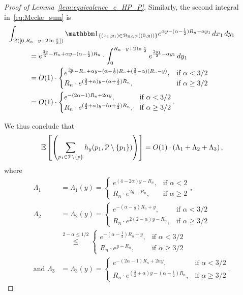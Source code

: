 \begin{proof}[Proof of Lemma~\ref{lem:equivalence_c_HP_P}]
Similarly, the second integral in~\eqref{eq:Mecke_sum} is
\begin{align*}
	&\hspace{-30pt}\int_{\Rcal ([0, R_n - y + 2 \ln \frac{\pi}{2}])} \ind{(x_1,y_1) \in \BallSym{(0,y)}} e^{\alpha y - (\alpha - \frac{1}{2})R_n - \alpha y_1} \, dx_1 \, dy_1\\
	&= e^{\frac{3y}{2} - R_n + \alpha y - (\alpha - \frac{1}{2})R_n} 
    	\cdot \int_{0}^{R_n - y + 2 \ln \frac{\pi}{2}} e^{\frac{3y_1}{2}-\alpha y_1} \, dy_1\\
	&= O(1)\cdot 
	\begin{cases} 
	e^{\frac{3y}{2} - R_n + \alpha y - (\alpha - \frac{1}{2})R_n + (\frac{3}{2} - \alpha)(R_n-y)} 
	, & \mbox{if $\alpha < 3/2$} \\ 
	R_n \cdot e^{(\frac{3}{2} +\alpha)y -  (\alpha + \frac{1}{2})R_n}, & \mbox{if 
	$\alpha \geq 3/2$}
	\end{cases}	\\
	&= O(1) \cdot 
	\begin{cases}
	  e^{-(2\alpha-1) R_n + 2 \alpha y}, & \mbox{if $\alpha < 3/2$} \\
	  R_n \cdot e^{(\frac{3}{2} +\alpha)y -  (\alpha + \frac{1}{2})R_n}, & \mbox{if 
	$\alpha \geq 3/2$}
	\end{cases}.
\end{align*}

We thus conclude that 
\begin{equation} \label{eq:upper_bound_faulty_edges} 
\mathbb{E}\left[\left( \sum_{p_1 \in {\mathcal P} \setminus\{p\}} 
		h_y (p_1, {\mathcal P} \setminus \{ p_1 \})\right)\right]  = O(1) \cdot 
\left( \Lambda_1 + \Lambda_2 + \Lambda_3 \right),
\end{equation}
where 
\begin{align*}
 \Lambda_1 &= \Lambda_1 (y) =\begin{cases}
	e^{(4-2\alpha) y - R_n}, & \mbox{if $\alpha < 2$} \\
	R_n \cdot e^{2y - R_n}, & \mbox{if $\alpha \geq 2$}
	\end{cases},  \\
\Lambda_2 &= \Lambda_2 (y) = 
\begin{cases}
	e^{-(\alpha - \frac{1}{2})R_n +y}, & \mbox{if $\alpha < 3/2$} \\
	R_n \cdot  e^{2(2-\alpha)y - R_n}, & \mbox{if $\alpha \geq 3/2$}
	\end{cases} \\
	&\stackrel{2-\alpha \leq 1/2}{\leq}
	\begin{cases}
	e^{-(\alpha - \frac{1}{2})R_n +y}, & \mbox{if $\alpha < 3/2$} \\
	R_n \cdot  e^{y - R_n}, & \mbox{if $\alpha \geq 3/2$}
	\end{cases}\\
\mbox{and } \Lambda_3 &= \Lambda_3 (y) = 
\begin{cases}
	  e^{-(2\alpha-1) R_n + 2 \alpha y}, & \mbox{if $\alpha < 3/2$} \\
	  R_n \cdot e^{(\frac{3}{2} +\alpha)y -  (\alpha + \frac{1}{2})R_n}, & \mbox{if 
	$\alpha \geq 3/2$}
	\end{cases}.
\end{align*}


\end{proof}
